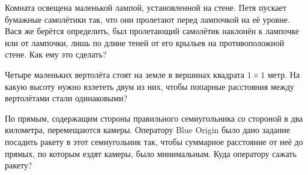 \begin{itemize}
\itA Комната освещена маленькой лампой, установленной на стене. Петя пускает бумажные самолётики так, что они пролетают перед лампочкой на её уровне. Вася же берётся определить, был пролетающий самолётик наклонён к лампочке или от лампочки, лишь по длине теней от его крыльев на противоположной стене. Как ему это сделать?

\itB Четыре маленьких вертолёта стоят на земле в вершинах квадрата $1 \times 1$ метр. На какую высоту нужно взлететь двум из них, чтобы попарные расстояния между вертолётами стали одинаковыми?

\itC По прямым, содержащим стороны правильного семиугольника со стороной в два километра, перемещаются камеры. Оператору Blue Origin было дано задание посадить ракету в этот семиугольник так, чтобы суммарное расстояние от неё до прямых, по которым ездят камеры, было минимальным. Куда оператору сажать ракету?
\end{itemize}
